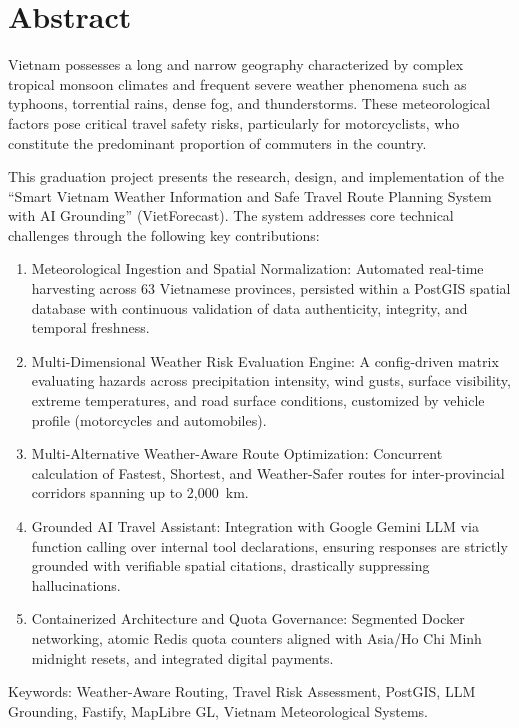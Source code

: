 \chapter*{Abstract}

Vietnam possesses a long and narrow geography characterized by complex tropical monsoon climates and frequent severe weather phenomena such as typhoons, torrential rains, dense fog, and thunderstorms. These meteorological factors pose critical travel safety risks, particularly for motorcyclists, who constitute the predominant proportion of commuters in the country.

This graduation project presents the research, design, and implementation of the “Smart Vietnam Weather Information and Safe Travel Route Planning System with AI Grounding” (VietForecast). The system addresses core technical challenges through the following key contributions:
\begin{enumerate}
    \item Meteorological Ingestion and Spatial Normalization: Automated real-time harvesting across 63 Vietnamese provinces, persisted within a PostGIS spatial database with continuous validation of data authenticity, integrity, and temporal freshness.
    \item Multi-Dimensional Weather Risk Evaluation Engine: A config-driven matrix evaluating hazards across precipitation intensity, wind gusts, surface visibility, extreme temperatures, and road surface conditions, customized by vehicle profile (motorcycles and automobiles).
    \item Multi-Alternative Weather-Aware Route Optimization: Concurrent calculation of Fastest, Shortest, and Weather-Safer routes for inter-provincial corridors spanning up to 2,000~km.
    \item Grounded AI Travel Assistant: Integration with Google Gemini LLM via function calling over internal tool declarations, ensuring responses are strictly grounded with verifiable spatial citations, drastically suppressing hallucinations.
    \item Containerized Architecture and Quota Governance: Segmented Docker networking, atomic Redis quota counters aligned with Asia/Ho Chi Minh midnight resets, and integrated digital payments.
\end{enumerate}

\vspace{0.5cm}
\noindent Keywords: Weather-Aware Routing, Travel Risk Assessment, PostGIS, LLM Grounding, Fastify, MapLibre GL, Vietnam Meteorological Systems.
